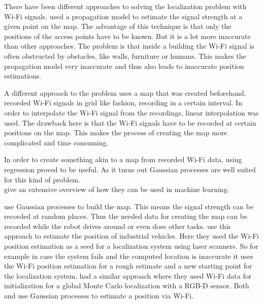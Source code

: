 There have been different approaches to solving the localization problem with Wi-Fi signals. \cite{serrano2012robot} used a propagation model to estimate the signal strength at a given point on the map. The advantage of this technique is that only the positions of the access points have to be known. But it is a lot more inaccurate than other approaches. The problem is that inside a building the Wi-Fi signal is often obstructed by obstacles, like walls, furniture or humans.  This makes the propagation model very inaccurate and thus also leads to inaccurate position estimations.

A different approach to the problem uses a map that was created beforehand. \cite{biswas2010wifi} recorded Wi-Fi signals in grid like fashion, recording in a certain interval. In order to interpolate the Wi-Fi signal from the recordings, linear interpolation was used. The drawback here is that the Wi-Fi signals have to be recorded at certain positions on the map. This makes the process of creating the map more complicated and time consuming.

In order to create something akin to a map from recorded Wi-Fi data, using regression proved to be useful. As it turns out Gaussian processes are well suited for this kind of problem.\\ \cite{Rasmussen:2005:GPM:1162254} give an extensive overview of how they can be used in machine learning. 

\cite{ferris2006gaussian} use Gaussian processes to build the map. This means the signal strength can be recorded at random places. Thus the needed data for creating the map can be recorded while the robot drives around or even does other tasks. 
\cite{duvallet2008wifi} use this approach to estimate the position of industrial vehicles. Here they used the Wi-Fi position estimation as a seed for a localization system using laser scanners. So for example in case the system fails and the computed location is inaccurate it uses the Wi-Fi position estimation for a rough estimate and a new starting point for the localization system.
\cite{DBLP:conf/icra/ItoEKTSB14} had a similar approach where they used Wi-Fi data for initialization for a global Monte Carlo localization with a RGB-D sensor. Both \cite{DBLP:conf/icra/ItoEKTSB14} and \cite{duvallet2008wifi} use Gaussian processes to estimate a position via Wi-Fi. 